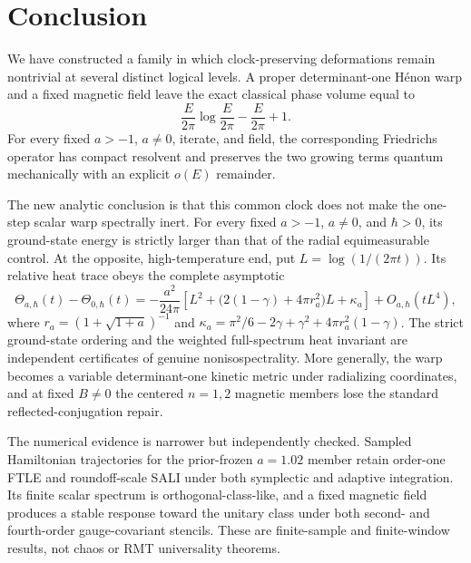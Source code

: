 \section{Conclusion}
\label{sec:conclusion}

We have constructed a family in which clock-preserving deformations remain
nontrivial at several distinct logical levels.  A proper determinant-one
H\'enon warp and a fixed magnetic field leave the exact classical phase
volume equal to
\[
 \frac{E}{2\pi}\log\frac{E}{2\pi}-\frac{E}{2\pi}+1.
\]
For every fixed \(a>-1\), \(a\neq0\), iterate, and field, the corresponding
Friedrichs operator has compact resolvent and preserves the two growing terms
quantum mechanically with an explicit \(o(E)\) remainder.

The new analytic conclusion is that this common clock does not make the
one-step scalar warp spectrally inert.  For every fixed \(a>-1\),
\(a\ne0\), and \(\hbar>0\), its ground-state energy is strictly larger than
that of the radial equimeasurable control.  At the opposite,
high-temperature end, put \(L=\log(1/(2\pi t))\).  Its relative heat trace
obeys the complete asymptotic
\[
 \Theta_{a,\hbar}(t)-\Theta_{0,\hbar}(t)
 =-\frac{a^2}{24\pi}
 \left[L^2+\bigl(2(1-\gamma)+4\pi r_a^2\bigr)L+\kappa_a\right]
 +O_{a,\hbar}(tL^4),
\]
where \(r_a=(1+\sqrt{1+a})^{-1}\) and
\(\kappa_a=\pi^2/6-2\gamma+\gamma^2+4\pi r_a^2(1-\gamma)\).  The strict
ground-state ordering and the weighted full-spectrum heat invariant are
independent certificates of genuine nonisospectrality.  More generally, the
warp becomes a variable determinant-one kinetic metric under radializing
coordinates, and at fixed \(B\neq0\) the centered \(n=1,2\) magnetic members
lose the standard reflected-conjugation repair.

The numerical evidence is narrower but independently checked.  Sampled
Hamiltonian trajectories for the prior-frozen \(a=1.02\) member retain
order-one FTLE and roundoff-scale SALI under both symplectic and adaptive
integration.  Its finite scalar spectrum is orthogonal-class-like, and a
fixed magnetic field produces a stable response toward the unitary class
under both second- and fourth-order gauge-covariant stencils.  These are
finite-sample and finite-window results, not chaos or RMT universality
theorems.

